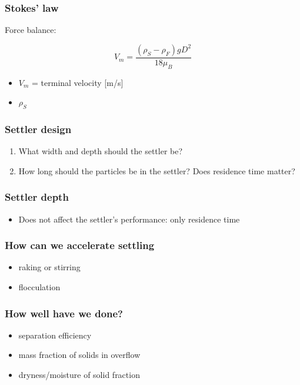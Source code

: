 \begin{frame}\frametitle{Stokes' law}
	
	Force balance:
	
	\[
		V_m = \frac{\left( \rho_S - \rho_F \right) g D^2}{18 \mu_B}
	\]
	
	
	\begin{itemize}
		\item	$V_m$ = terminal velocity [m/s]
		\item	$\rho_S$ %
	\end{itemize}
	
\end{frame}

\begin{frame}\frametitle{Settler design}
	\begin{enumerate}
		\item	What width and depth should the settler be?
		\item	How long should the particles be in the settler? Does residence time matter?
	\end{enumerate}
\end{frame}

\begin{frame}\frametitle{Settler depth}
	\begin{itemize}
		\item	Does not affect the settler's performance: only residence time
	\end{itemize}
	
\end{frame}

\begin{frame}\frametitle{How can we accelerate settling}
	\begin{itemize}
		\item	raking or stirring
		\item	flocculation
	\end{itemize}
\end{frame}

\begin{frame}\frametitle{How well have we done?}
	\begin{itemize}
		\item	separation efficiency
		\item	mass fraction of solids in overflow
		\item	dryness/moisture of solid fraction
	\end{itemize}
\end{frame}


